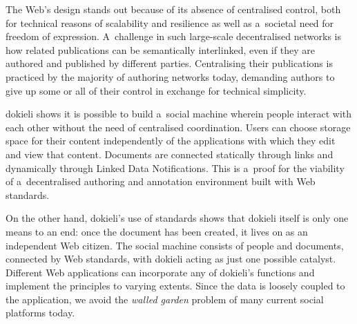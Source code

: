 \documentclass[a4paper]{llncs}
\begin{document}
                        
                            
\par 
                                The Web’s design stands out because of
                                its absence of centralised control,
                                both for technical reasons of scalability and resilience
                                as well as a societal need for freedom of expression.
                                A challenge in such large-scale decentralised networks
                                is how related publications can be semantically interlinked,
                                even if they are authored and published by different parties.
                                Centralising their publications is
                                practiced by the majority of authoring networks today,
                                demanding authors to give up some or all of their control
                                in exchange for technical simplicity.
                            
                            
\par 
                                dokieli shows
                                it is possible to build a social machine
                                wherein people interact with each other
                                without the need of centralised coordination.
                                Users can choose storage space for their content
                                independently of the applications with which they edit and view that content.
                                Documents are connected statically through links
                                and dynamically through Linked Data Notifications.
                                This is a proof for the viability of a decentralised authoring
                                and annotation environment built with Web standards.
                            
                            
\par 
                                On the other hand, dokieli’s use of standards
                                shows that dokieli itself is only one means to an end:
                                once the document has been created,
                                it lives on as an independent Web citizen.
                                The social machine consists of people and documents,
                                connected by Web standards,
                                with dokieli acting as just one possible catalyst.
                                Different Web applications can incorporate any of dokieli’s functions
                                and implement the principles to varying extents.
                                Since the data is loosely coupled to the application,
                                we avoid the {\em walled garden} problem
                                of many current social platforms today.
                            
\end{document}
